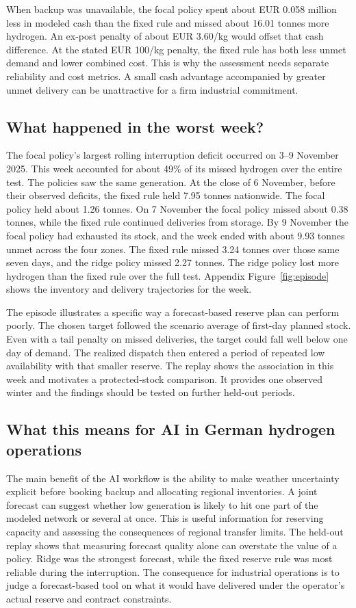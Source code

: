 When backup was unavailable, the focal policy spent about EUR 0.058 million less in modeled cash than the fixed rule and missed about 16.01 tonnes more hydrogen. An ex-post penalty of about EUR 3.60/kg would offset that cash difference. At the stated EUR 100/kg penalty, the fixed rule has both less unmet demand and lower combined cost. This is why the assessment needs separate reliability and cost metrics. A small cash advantage accompanied by greater unmet delivery can be unattractive for a firm industrial commitment.

\subsection{What happened in the worst week?}
The focal policy's largest rolling interruption deficit occurred on 3--9 November 2025. This week accounted for about 49\% of its missed hydrogen over the entire test. The policies saw the same generation. At the close of 6 November, before their observed deficits, the fixed rule held 7.95 tonnes nationwide. The focal policy held about 1.26 tonnes. On 7 November the focal policy missed about 0.38 tonnes, while the fixed rule continued deliveries from storage. By 9 November the focal policy had exhausted its stock, and the week ended with about 9.93 tonnes unmet across the four zones. The fixed rule missed 3.24 tonnes over those same seven days, and the ridge policy missed 2.27 tonnes. The ridge policy lost more hydrogen than the fixed rule over the full test. Appendix Figure~\ref{fig:episode} shows the inventory and delivery trajectories for the week.

The episode illustrates a specific way a forecast-based reserve plan can perform poorly. The chosen target followed the scenario average of first-day planned stock. Even with a tail penalty on missed deliveries, the target could fall well below one day of demand. The realized dispatch then entered a period of repeated low availability with that smaller reserve. The replay shows the association in this week and motivates a protected-stock comparison. It provides one observed winter and the findings should be tested on further held-out periods.

\subsection{What this means for AI in German hydrogen operations}
The main benefit of the AI workflow is the ability to make weather uncertainty explicit before booking backup and allocating regional inventories. A joint forecast can suggest whether low generation is likely to hit one part of the modeled network or several at once. This is useful information for reserving capacity and assessing the consequences of regional transfer limits. The held-out replay shows that measuring forecast quality alone can overstate the value of a policy. Ridge was the strongest forecast, while the fixed reserve rule was most reliable during the interruption. The consequence for industrial operations is to judge a forecast-based tool on what it would have delivered under the operator's actual reserve and contract constraints.

